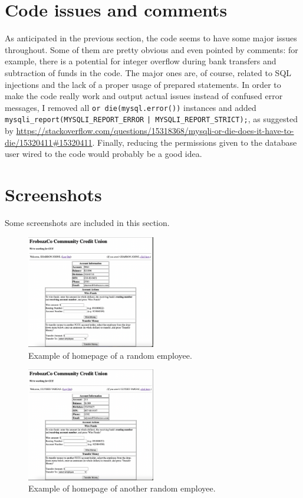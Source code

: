 \documentclass[a4paper,11pt,hidelinks]{article}
\begin{document}
\section{Code issues and comments}

As anticipated in the previous section, the code seems to have some major issues throughout. Some of them are pretty obvious and even pointed by comments: for example, there is a potential for integer overflow during bank transfers and subtraction of funds in the code. The major ones are, of course, related to SQL injections and the lack of a proper usage of prepared statements. In order to make the code really work and output actual issues instead of confused error messages, I removed all \verb=or die(mysql.error())= instances and added \verb=mysqli_report(MYSQLI_REPORT_ERROR= \verb=| MYSQLI_REPORT_STRICT);=, as suggested by \url{https://stackoverflow.com/questions/15318368/mysqli-or-die-does-it-have-to-die/15320411#15320411}. Finally, reducing the permissions given to the database user wired to the code would probably be a good idea.


\section{Screenshots}

Some screenshots are included in this section.

\begin{figure}[hb!]
  \centering
  \includegraphics[width=0.5\textwidth]{../drawable/random-guy-1}
  \caption{Example of homepage of a random employee.}
\end{figure}

\begin{figure}[hb!]
  \centering
  \includegraphics[width=0.5\textwidth]{../drawable/random-guy-2}
  \caption{Example of homepage of another random employee.}
\end{figure}
\end{document}
